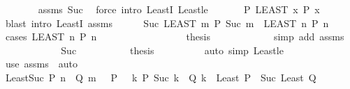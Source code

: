 \begin{isabellebody}
\ \ \ \ \ \ \isamarkupfalse%
\ assms\ Suc\ \isamarkupfalse%
\ {\isacharparenleft}{\kern0pt}force\ intro{\isacharcolon}{\kern0pt}\ LeastI\ Least{\isacharunderscore}{\kern0pt}le{\isacharparenright}{\kern0pt}\isanewline
\ \ \ \ \isamarkupfalse%
\ {\isasymsection}{\isacharcolon}{\kern0pt}\ {\isachardoublequoteopen}P\ {\isacharparenleft}{\kern0pt}LEAST\ x{\isachardot}{\kern0pt}\ P\ x{\isacharparenright}{\kern0pt}{\isachardoublequoteclose}\isanewline
\ \ \ \ \ \ \isamarkupfalse%
\ {\isacharparenleft}{\kern0pt}blast\ intro{\isacharcolon}{\kern0pt}\ LeastI\ assms{\isacharparenright}{\kern0pt}\isanewline
\ \ \ \ \isamarkupfalse%
\ {\isachardoublequoteopen}Suc\ {\isacharparenleft}{\kern0pt}LEAST\ m{\isachardot}{\kern0pt}\ P\ {\isacharparenleft}{\kern0pt}Suc\ m{\isacharparenright}{\kern0pt}{\isacharparenright}{\kern0pt}\ {\isasymle}\ {\isacharparenleft}{\kern0pt}LEAST\ n{\isachardot}{\kern0pt}\ P\ n{\isacharparenright}{\kern0pt}{\isachardoublequoteclose}\isanewline
\ \ \ \ \isamarkupfalse%
\ {\isacharparenleft}{\kern0pt}cases\ {\isachardoublequoteopen}{\isacharparenleft}{\kern0pt}LEAST\ n{\isachardot}{\kern0pt}\ P\ n{\isacharparenright}{\kern0pt}{\isachardoublequoteclose}{\isacharparenright}{\kern0pt}\isanewline
\ \ \ \ \ \ \isamarkupfalse%
\ {}\isanewline
\ \ \ \ \ \ \isamarkupfalse%
\ \isamarkupfalse%
\ {\isacharquery}{\kern0pt}thesis\isanewline
\ \ \ \ \ \ \ \ \isamarkupfalse%
\ {\isasymsection}\ \isamarkupfalse%
\ {\isacharparenleft}{\kern0pt}simp\ add{\isacharcolon}{\kern0pt}\ assms{\isacharparenright}{\kern0pt}\isanewline
\ \ \ \ \isamarkupfalse%
\isanewline
\ \ \ \ \ \ \isamarkupfalse%
\ Suc\isanewline
\ \ \ \ \ \ \isamarkupfalse%
\ {\isasymsection}\ \isamarkupfalse%
\ {\isacharquery}{\kern0pt}thesis\isanewline
\ \ \ \ \ \ \ \ \isamarkupfalse%
\ {\isacharparenleft}{\kern0pt}auto\ simp{\isacharcolon}{\kern0pt}\ Least{\isacharunderscore}{\kern0pt}le{\isacharparenright}{\kern0pt}\isanewline
\ \ \ \ \isamarkupfalse%
\isanewline
\ \ \isamarkupfalse%
\isanewline
{}\isamarkupfalse%
\ {\isacharparenleft}{\kern0pt}use\ assms\ \ auto{\isacharparenright}{\kern0pt}%
\endisatagproof
{\isafoldproof}%
%
\isadelimproof
\isanewline
%
\endisadelimproof
\isanewline
{}\isamarkupfalse%
\ Least{\isacharunderscore}{\kern0pt}Suc{}{\isacharcolon}{\kern0pt}\ {\isachardoublequoteopen}P\ n\ {\isasymLongrightarrow}\ Q\ m\ {\isasymLongrightarrow}\ {\isasymnot}\ P\ {}\ {\isasymLongrightarrow}\ {\isasymforall}k{\isachardot}{\kern0pt}\ P\ {\isacharparenleft}{\kern0pt}Suc\ k{\isacharparenright}{\kern0pt}\ {\isacharequal}{\kern0pt}\ Q\ k\ {\isasymLongrightarrow}\ Least\ P\ {\isacharequal}{\kern0pt}\ Suc\ {\isacharparenleft}{\kern0pt}Least\ Q{\isacharparenright}{\kern0pt}{\isachardoublequoteclose}\isanewline

\end{isabellebody}
